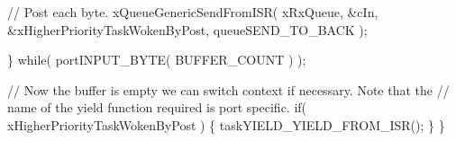\begin{DoxyPre}    // Post each byte.
    xQueueGenericSendFromISR( xRxQueue, \&cIn, \&xHigherPriorityTaskWokenByPost, queueSEND\_TO\_BACK );\end{DoxyPre}



\begin{DoxyPre}   \} while( portINPUT\_BYTE( BUFFER\_COUNT ) );\end{DoxyPre}



\begin{DoxyPre}   // Now the buffer is empty we can switch context if necessary.  Note that the
   // name of the yield function required is port specific.
   if( xHigherPriorityTaskWokenByPost )
   \{
    taskYIELD\_YIELD\_FROM\_ISR();
   \}
\}
\end{DoxyPre}
 